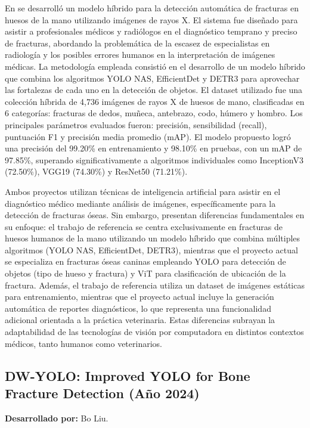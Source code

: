 {En \cite{abdelrahman2024} se desarrolló un modelo híbrido para la detección automática de fracturas en huesos de la mano utilizando imágenes de rayos X. El sistema fue diseñado para asistir a profesionales médicos y radiólogos en el diagnóstico temprano y preciso de fracturas, abordando la problemática de la escasez de especialistas en radiología y los posibles errores humanos en la interpretación de imágenes médicas. La metodología empleada consistió en el desarrollo de un modelo híbrido que combina los algoritmos YOLO NAS, EfficientDet y DETR3 para aprovechar las fortalezas de cada uno en la detección de objetos. El dataset utilizado fue una colección híbrida de 4,736 imágenes de rayos X de huesos de mano, clasificadas en 6 categorías: fracturas de dedos, muñeca, antebrazo, codo, húmero y hombro. Los principales parámetros evaluados fueron: precisión, sensibilidad (recall), puntuación F1 y precisión media promedio (mAP). El modelo propuesto logró una precisión del 99.20\% en entrenamiento y 98.10\% en pruebas, con un mAP de 97.85\%, superando significativamente a algoritmos individuales como InceptionV3 (72.50\%), VGG19 (74.30\%) y ResNet50 (71.21\%).

Ambos proyectos utilizan técnicas de inteligencia artificial para asistir en el diagnóstico médico mediante análisis de imágenes, específicamente para la detección de fracturas óseas. Sin embargo, presentan diferencias fundamentales en su enfoque: el trabajo de referencia se centra exclusivamente en fracturas de huesos humanos de la mano utilizando un modelo híbrido que combina múltiples algoritmos (YOLO NAS, EfficientDet, DETR3), mientras que el proyecto actual se especializa en fracturas óseas caninas empleando YOLO para detección de objetos (tipo de hueso y fractura) y ViT para clasificación de ubicación de la fractura. Además, el trabajo de referencia utiliza un dataset de imágenes estáticas para entrenamiento, mientras que el proyecto actual incluye la generación automática de reportes diagnósticos, lo que representa una funcionalidad adicional orientada a la práctica veterinaria. Estas diferencias subrayan la adaptabilidad de las tecnologías de visión por computadora en distintos contextos médicos, tanto humanos como veterinarios.

\subsection{DW-YOLO: Improved YOLO for Bone Fracture Detection (Año 2024)}

\textbf{Desarrollado por:} Bo Liu.
 
}
